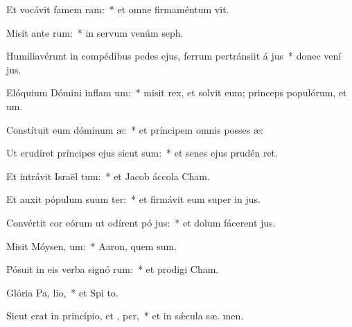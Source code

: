\item Et vocávit famem  ram:~* et omne firmaméntum  vit.
\item Misit ante  rum:~* in servum venúm  seph.
\item Humiliavérunt in compédibus pedes ejus, ferrum pertránsiit á jus~* donec vení  jus.
\item Elóquium Dómini inflam um:~* misit rex, et solvit eum; princeps populórum, et  um.
\item Constítuit eum dóminum  æ:~* et príncipem omnis posses æ:
\item Ut erudíret príncipes ejus sicut sum:~* et senes ejus prudén ret.
\item Et intrávit Israël  tum:~* et Jacob áccola    Cham.
\item Et auxit pópulum suum ter:~* et firmávit eum super in jus.
\item Convértit cor eórum ut odírent pó jus:~* et dolum fácerent   jus.
\item Misit Móysen,  um:~* Aaron, quem  sum.
\item Pósuit in eis verba signó rum:~* et prodigi   Cham.
\item Glória Pa,  lio,~* et Spi to.
\item Sicut erat in princípio, et ,  per,~* et in sǽcula sæ. men.

